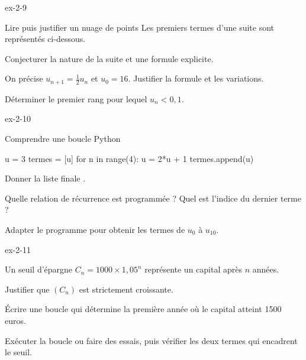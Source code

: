 \begin{blocLivre}{ex-2-9}
\begin{exercice}[2]{Lire puis justifier un nuage de points}
Les premiers termes d'une suite sont représentés ci-dessous.
\begin{center}\end{center}
\begin{questions}\item Conjecturer la nature de la suite et une formule explicite.
\item On précise $u_{n+1}=\frac12u_n$ et $u_0=16$. Justifier la formule et les variations.
\item Déterminer le premier rang pour lequel $u_n<0{,}1$.
\end{questions}
\end{exercice}
\end{blocLivre}
\begin{blocLivre}{ex-2-10}
\begin{exercice}[2]{Comprendre une boucle Python}
\begin{python}
u = 3
termes = [u]
for n in range(4):
    u = 2*u + 1
    termes.append(u)
\end{python}
\begin{questions}\item Donner la liste finale .
\item Quelle relation de récurrence est programmée ? Quel est l'indice du dernier terme ?
\item Adapter le programme pour obtenir les termes de $u_0$ à $u_{10}$.
\end{questions}
\end{exercice}
\end{blocLivre}
\begin{blocLivre}{ex-2-11}
\begin{exercice}[2]{Un seuil d'épargne}
$C_n=1000\times1{,}05^n$ représente un capital après $n$ années.
\begin{questions}\item Justifier que $(C_n)$ est strictement croissante.
\item Écrire une boucle qui détermine la première année où le capital atteint 1500 euros.
\item Exécuter la boucle ou faire des essais, puis vérifier les deux termes qui encadrent le seuil.
\end{questions}
\end{exercice}
\end{blocLivre}
